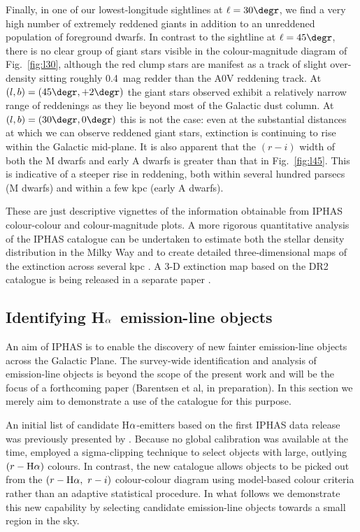 \documentclass[a4paper,useAMS,usenatbib]{mn2e}
\def\ha{\mbox{H$\rm \alpha$}}
\begin{document}
Finally, in one of our lowest-longitude sightlines at $\ell=30\degr$,
we find a very high number of extremely reddened giants
in addition to an unreddened population
of foreground dwarfs.
In contrast to the sightline at $\ell=45\degr$,
there is no clear group of giant stars visible
in the colour-magnitude diagram of Fig.~\ref{fig:l30},
although the red clump stars are manifest as a track of slight 
over-density sitting roughly 0.4~mag redder than the A0V reddening track.
At $(l,b)=(45\degr, +2\degr)$ the giant stars observed
exhibit a relatively narrow range of reddenings
as they lie beyond most of the Galactic dust column.
At $(l,b)=(30\degr, 0\degr)$ this is not the case:
even at the substantial distances
at which we can observe reddened giant stars,
extinction is continuing to rise within the Galactic mid-plane.
It is also apparent that the $(r-i)$ width of both the M dwarfs
and early A dwarfs is greater than that in Fig.~\ref{fig:l45}.
This is indicative of a steeper rise in reddening,
both within several hundred parsecs (M dwarfs)
and within a few kpc (early A dwarfs).

These are just descriptive vignettes of the information obtainable
from IPHAS colour-colour and colour-magnitude plots.
A more rigorous quantitative analysis of the IPHAS catalogue
can be undertaken to estimate both the stellar density distribution 
in the Milky Way \citep{Sale2010} and to create detailed three-dimensional 
maps of the extinction across several kpc \citep{Sale2009,Sale2012}.
A 3-D extinction map based on the DR2 catalogue
is being released in a separate paper \citep{Sale2014}.

\subsection{Identifying \ha\ emission-line objects}

An aim of IPHAS is to enable the discovery 
of new fainter emission-line objects
across the Galactic Plane.
The survey-wide identification and analysis 
of emission-line objects is beyond the scope
of the present work and will be the focus
of a forthcoming paper (Barentsen et al, in preparation).
In this section we merely aim to demonstrate
a use of the catalogue for this purpose.

An initial list of candidate \ha-emitters
based on the first IPHAS data release was previously
presented by \cite{Witham2008}. 
Because no global calibration was available
at the time, \citeauthor{Witham2008} employed 
a sigma-clipping technique to select objects with
large, outlying $(r-\ha)$ colours.
In contrast, the new catalogue
allows objects to be picked out
from the $(r-\ha,\ r-i)$ colour-colour diagram
using model-based colour criteria
rather than an adaptive statistical procedure.
In what follows we demonstrate this new capability 
by selecting candidate emission-line objects
towards a small region in the sky.
\end{document}
